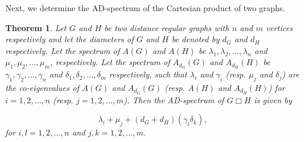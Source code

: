 \documentclass[12pt]{article}
\numberwithin{equation}{section}
\newtheorem{thm}{Theorem}[section]
\begin{document}
		Next, we determine the AD-spectrum of the Cartesian product of two graphs.
		
		\begin{thm}
			Let $G$ and $H$ be two distance regular graphs with $n$ and $m$ vertices respectively and let the diameters of $G$ and $H$ be denoted by $d_G$ and $d_H$ respectively. Let the spectrum of $A(G)$ and $A(H)$ be $\lambda_{1}, \lambda_2, \dots, \lambda_n$ and $\mu_1, \mu_2, \dots , \mu_m$, respectively. Let the spectrum of $A_{d_G}(G)$ and $A_{d_H}(H)$ be $\gamma_1,\gamma_2,\dots,\gamma_n$ and $\delta_1, \delta_2,\dots,\delta_m$ respectively, such that $\lambda_i$ and $\gamma_i$ (resp. $\mu_j$ and $\delta_j$) are the co-eigenvalues of $A(G)$ and $A_{d_G}(G)$ (resp. $A(H)$ and $A_{d_H}(H)$) for $i=1,2,\dots,n$ (resp. $j=1,2,\dots,m$). Then the AD-spectrum of $G \Box H$ is given by
			
			$$\lambda_i+\mu_j+(d_G+d_H)(\gamma_l \delta_k),
			$$ for $i,l=1,2,\dots,n$ and $j,k=1,2,\dots,m$.
		\end{thm}
\end{document}
